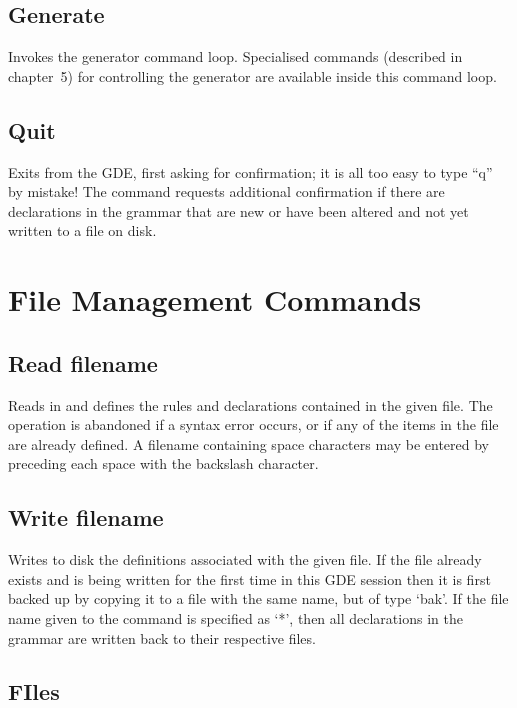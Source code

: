 \subsection{Generate}

Invokes the generator command loop. Specialised commands (described
in chapter~5) for controlling the generator are available inside this
command loop.

\subsection{Quit}

Exits from the GDE, first asking for confirmation; it is all too easy to
type ``q'' by mistake! The command requests additional confirmation if
there are declarations in the grammar that are new or have been altered
and not yet written to a file on disk.

\section{File Management Commands}

\subsection{Read filename}

Reads in and defines the rules and declarations contained in the given
file. The operation is abandoned if a syntax error occurs, or if any of
the items in the file are already defined. A filename containing space
characters may be entered by preceding each space with the backslash
character.

\subsection{Write filename}

Writes to disk the definitions associated with the given file. If the
file already exists and is being written for the first time in this GDE
session then it is first backed up by copying it to a file with the same
name, but of type `bak'. If the file name given to the command is
specified as `*', then all declarations in the grammar are written
back to their respective files.

\subsection{FIles}

